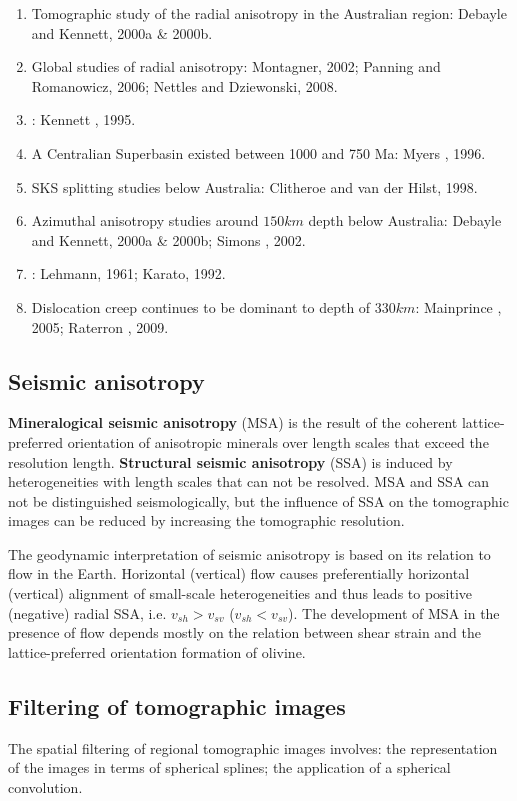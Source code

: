 \begin{enumerate}[\hspace{10mm}*]
  \item Tomographic study of the radial anisotropy in the Australian region:
    Debayle and Kennett, 2000a \& 2000b.
  \item Global studies of radial anisotropy: Montagner, 2002; Panning and Romanowicz, 2006;
    Nettles and Dziewonski, 2008.
  \item {}
    :
    Kennett \etal, 1995.
  \item A Centralian Superbasin existed between 1000 and 750 Ma: Myers \etal, 1996.
  \item SKS splitting studies below Australia: Clitheroe and van der Hilst, 1998.
  \item Azimuthal anisotropy studies around $150km$ depth below Australia:
    Debayle and Kennett, 2000a \& 2000b; Simons \etal, 2002.
  \item {}: Lehmann, 1961; Karato, 1992.
  \item Dislocation creep continues to be dominant to depth of $330km$:
    Mainprince \etal, 2005; Raterron \etal, 2009.
\end{enumerate}

\subsection{Seismic anisotropy}
\textbf{Mineralogical seismic anisotropy} (MSA)
is the result of the coherent lattice-preferred orientation of anisotropic minerals
over length scales that exceed the resolution length.
\textbf{Structural seismic anisotropy} (SSA)
is induced by heterogeneities with length scales that can not be resolved.
MSA and SSA can not be distinguished seismologically,
but the influence of SSA on the tomographic images can be reduced
by increasing the tomographic resolution.

The geodynamic interpretation of seismic anisotropy is based on its relation to flow in the Earth.
Horizontal (vertical) flow causes preferentially horizontal (vertical) alignment
of small-scale heterogeneities and thus leads to positive (negative) radial SSA,
i.e. $v_{sh}>v_{sv}$ ($v_{sh}<v_{sv}$).
The development of MSA in the presence of flow depends mostly on the relation
between shear strain and the lattice-preferred orientation formation of olivine.

\subsection{Filtering of tomographic images}
The spatial filtering of regional tomographic images involves:
the representation of the images in terms of spherical splines;
the application of a spherical convolution.

